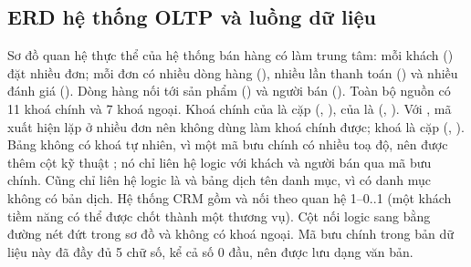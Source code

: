 \subsection{ERD hệ thống OLTP và luồng dữ liệu}
Sơ đồ quan hệ thực thể của hệ thống bán hàng có  làm trung tâm: mỗi khách () đặt nhiều đơn; mỗi đơn có nhiều dòng hàng (), nhiều lần thanh toán () và nhiều đánh giá (). Dòng hàng nối tới sản phẩm () và người bán (). Toàn bộ nguồn có 11 khoá chính và 7 khoá ngoại. Khoá chính của  là cặp (, ), của  là (, ). Với , mã  xuất hiện lặp ở nhiều đơn nên không dùng làm khoá chính được; khoá là cặp (, ). Bảng  không có khoá tự nhiên, vì một mã bưu chính có nhiều toạ độ, nên được thêm cột kỹ thuật ; nó chỉ liên hệ logic với khách và người bán qua mã bưu chính. Cũng chỉ liên hệ logic là  và bảng dịch tên danh mục, vì có danh mục không có bản dịch. Hệ thống CRM gồm  và  nối theo quan hệ 1–0..1 (một khách tiềm năng có thể được chốt thành một thương vụ). Cột  nối logic sang  bằng đường nét đứt trong sơ đồ và không có khoá ngoại. Mã bưu chính trong bản dữ liệu này đã đầy đủ 5 chữ số, kể cả số 0 đầu, nên được lưu dạng văn bản.

